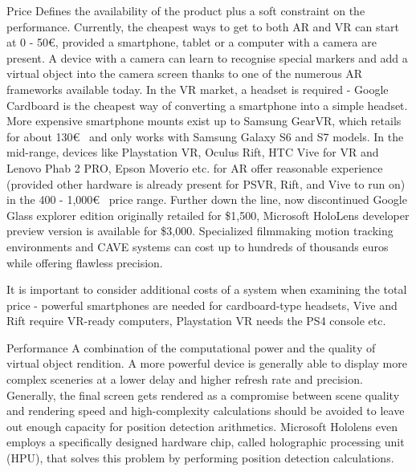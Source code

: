 \documentclass[12pt, a4paper]{article}
\newenvironment{definitions}
{\begin{description}[style=nextline]}
{\end{description}}
\begin{document}
\begin{definitions}
\item[Price] Defines the availability of the product plus a soft constraint on the performance. Currently, the cheapest ways to get to both AR and VR can start at 0 - 50\euro, provided a smartphone, tablet or a computer with a camera are present. A device with a camera can learn to recognise special markers and add a virtual object into the camera screen thanks to one of the numerous AR frameworks available today. In the VR market, a headset is required - Google Cardboard is the cheapest way of converting a smartphone into a simple headset. More expensive smartphone mounts exist up to Samsung GearVR, which retails for about 130\euro~ and only works with Samsung Galaxy S6 and S7 models. In the mid-range, devices like Playstation VR, Oculus Rift, HTC Vive for VR and Lenovo Phab 2 PRO, Epson Moverio etc. for AR offer reasonable experience (provided other hardware is already present for PSVR, Rift, and Vive to run on) in the 400 - 1,000\euro~ price range. Further down the line, now discontinued Google Glass explorer edition originally retailed for \$1,500, Microsoft HoloLens developer preview version is available for \$3,000. Specialized filmmaking motion tracking environments and CAVE systems can cost up to hundreds of thousands euros while offering flawless precision.

It is important to consider additional costs of a system when examining the total price - powerful smartphones are needed for cardboard-type headsets, Vive and Rift require VR-ready computers, Playstation VR needs the PS4 console etc.
\item[Performance]A combination of the computational power and the quality of virtual object rendition. A more powerful device is generally able to display more complex sceneries at a lower delay and higher refresh rate and precision. Generally, the final screen gets rendered as a compromise between scene quality and rendering speed and high-complexity calculations should be avoided to leave out enough capacity for position detection arithmetics. Microsoft Hololens even employs a specifically designed hardware chip, called holographic processing unit (HPU), that solves this problem by performing position detection calculations.


\end{definitions}
\end{document}
